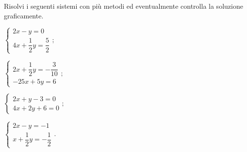 \begin{esercizio}[\Ast]
 \label{ese:19.75}
 Risolvi i seguenti sistemi con più metodi ed eventualmente controlla
la soluzione graficamente.
\begin{multicols}{2}
\begin{enumeratea}
 {\longarray
\item $\left\{\begin{array}{l}{2x-y=0}\\{4x+\dfrac{1}{2}y=\dfrac{5}{2}}\end{array}\right.;$
\item $\left\{\begin{array}{l}{2x+\dfrac{1}{2}y=-\dfrac{3}{10}}\\{-25x+5y=6}\end{array}\right.;$
\item $\left\{\begin{array}{l}{2x+y-3=0}\\{4x+2y+6=0}\end{array}\right.;$
\item $\left\{\begin{array}{l}{2x-y=-1}\\{x+\dfrac{1}{2}y=-{\dfrac{1}{2}}}\end{array}\right..$}
\end{enumeratea}
\end{multicols}
\end{esercizio}

